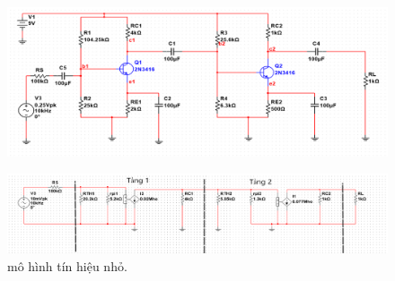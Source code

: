 
\begin{figure}[H]
	\centering
	\includegraphics[width=\linewidth]{./my-chapters/my-images/Question10/b_de.png}
\end{figure}

\begin{figure}[H]
	\centering
	\includegraphics[width=\linewidth]{./my-chapters/my-images/Question10/b_tang.png}
	\caption{mô hình tín hiệu nhỏ.}
\end{figure}

